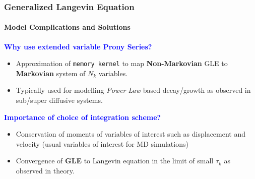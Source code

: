 \documentclass[a4paper,10pt]{beamer}
\begin{document}
	\begin{frame}
		\frametitle{Generalized Langevin Equation}
		\framesubtitle{Model Complications and Solutions}
		\small
		\textcolor{blue}{\textbf{Why use extended variable Prony Series?}}
		
		\begin{itemize}
			\item {Approximation of \texttt{memory kernel} to map {\textbf{Non-Markovian}} GLE to {\textbf{Markovian}} system of $N_{k}$ variables.}
			\item {Typically used for modelling \textit{Power Law} based decay/growth as observed in sub/super diffusive systems.}
		\end{itemize}
		
		\textcolor{blue}{\textbf{Importance of choice of integration scheme?}}
		
		\begin{itemize}
			\item {Conservation of moments of variables of interest such as displacement and velocity (usual variables of interest for MD simulations)}
			\item {Convergence of \textbf{GLE} to Langevin equation in the limit of small $\tau_{k}$ as observed in theory.}
		\end{itemize}
	\end{frame}
\end{document}
